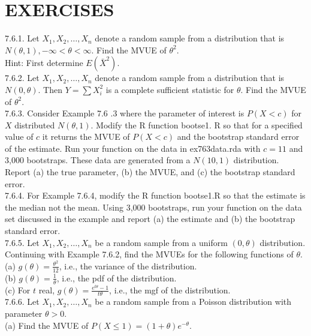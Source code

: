 \section*{EXERCISES}
7.6.1. Let $X_{1}, X_{2}, \ldots, X_{n}$ denote a random sample from a distribution that is $N(\theta, 1),-\infty<\theta<\infty$. Find the MVUE of $\theta^{2}$.\\
Hint: First determine $E\left(\bar{X}^{2}\right)$.\\
7.6.2. Let $X_{1}, X_{2}, \ldots, X_{n}$ denote a random sample from a distribution that is $N(0, \theta)$. Then $Y=\sum X_{i}^{2}$ is a complete sufficient statistic for $\theta$. Find the MVUE of $\theta^{2}$.\\
7.6.3. Consider Example 7.6 .3 where the parameter of interest is $P(X<c)$ for $X$ distributed $N(\theta, 1)$. Modify the R function bootse1. R so that for a specified value of $c$ it returns the MVUE of $P(X<c)$ and the bootstrap standard error of the estimate. Run your function on the data in ex763data.rda with $c=11$ and 3,000 bootstraps. These data are generated from a $N(10,1)$ distribution. Report (a) the true parameter, (b) the MVUE, and (c) the bootstrap standard error.\\
7.6.4. For Example 7.6.4, modify the R function bootse1.R so that the estimate is the median not the mean. Using 3,000 bootstraps, run your function on the data set discussed in the example and report (a) the estimate and (b) the bootstrap standard error.\\
7.6.5. Let $X_{1}, X_{2}, \ldots, X_{n}$ be a random sample from a uniform $(0, \theta)$ distribution. Continuing with Example 7.6.2, find the MVUEs for the following functions of $\theta$.\\
(a) $g(\theta)=\frac{\theta^{2}}{12}$, i.e., the variance of the distribution.\\
(b) $g(\theta)=\frac{1}{\theta}$, i.e., the pdf of the distribution.\\
(c) For $t$ real, $g(\theta)=\frac{e^{t \theta}-1}{t \theta}$, i.e., the mgf of the distribution.\\
7.6.6. Let $X_{1}, X_{2}, \ldots, X_{n}$ be a random sample from a Poisson distribution with parameter $\theta>0$.\\
(a) Find the MVUE of $P(X \leq 1)=(1+\theta) e^{-\theta}$.


